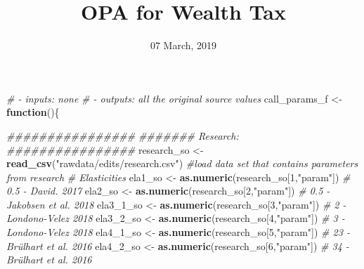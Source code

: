 \documentclass[]{article}
\title{OPA for Wealth Tax}
\author{}
\date{07 March, 2019}
\newenvironment{Shaded}{\begin{snugshade}}{\end{snugshade}}
\newcommand{\CommentTok}[1]{\textcolor[rgb]{0.56,0.35,0.01}{\textit{#1}}}
\newcommand{\ControlFlowTok}[1]{\textcolor[rgb]{0.13,0.29,0.53}{\textbf{#1}}}
\newcommand{\DecValTok}[1]{\textcolor[rgb]{0.00,0.00,0.81}{#1}}
\newcommand{\KeywordTok}[1]{\textcolor[rgb]{0.13,0.29,0.53}{\textbf{#1}}}
\newcommand{\NormalTok}[1]{#1}
\newcommand{\StringTok}[1]{\textcolor[rgb]{0.31,0.60,0.02}{#1}}
\begin{document}
\maketitle

\begin{Shaded}
\begin{Highlighting}[]
\CommentTok{# - inputs: none}
\CommentTok{# - outputs: all the original source values}
\NormalTok{call_params_f <-}\StringTok{ }\ControlFlowTok{function}\NormalTok{()\{}
  
  
  
    \CommentTok{################  }
    \CommentTok{####### Research:}
    \CommentTok{################  }
\NormalTok{    research_so <-}\StringTok{ }\KeywordTok{read_csv}\NormalTok{(}\StringTok{"rawdata/edits/research.csv"}\NormalTok{)      }\CommentTok{#load data set that contains parameters from research}
    \CommentTok{# Elasticities}
\NormalTok{    ela1_so <-}\StringTok{ }\KeywordTok{as.numeric}\NormalTok{(research_so[}\DecValTok{1}\NormalTok{,}\StringTok{"param"}\NormalTok{])           }\CommentTok{# 0.5 - David. 2017}
\NormalTok{    ela2_so <-}\StringTok{ }\KeywordTok{as.numeric}\NormalTok{(research_so[}\DecValTok{2}\NormalTok{,}\StringTok{"param"}\NormalTok{])           }\CommentTok{# 0.5 - Jakobsen et al. 2018}
\NormalTok{    ela3_}\DecValTok{1}\NormalTok{_so <-}\StringTok{ }\KeywordTok{as.numeric}\NormalTok{(research_so[}\DecValTok{3}\NormalTok{,}\StringTok{"param"}\NormalTok{])         }\CommentTok{# 2   - Londono-Velez 2018}
\NormalTok{    ela3_}\DecValTok{2}\NormalTok{_so <-}\StringTok{   }\KeywordTok{as.numeric}\NormalTok{(research_so[}\DecValTok{4}\NormalTok{,}\StringTok{"param"}\NormalTok{])       }\CommentTok{# 3   - Londono-Velez 2018}
\NormalTok{    ela4_}\DecValTok{1}\NormalTok{_so <-}\StringTok{ }\KeywordTok{as.numeric}\NormalTok{(research_so[}\DecValTok{5}\NormalTok{,}\StringTok{"param"}\NormalTok{])         }\CommentTok{# 23  - Brülhart et al. 2016}
\NormalTok{    ela4_}\DecValTok{2}\NormalTok{_so <-}\StringTok{ }\KeywordTok{as.numeric}\NormalTok{(research_so[}\DecValTok{6}\NormalTok{,}\StringTok{"param"}\NormalTok{])         }\CommentTok{# 34  - Brülhart et al. 2016}
    

\end{Highlighting}
\end{Shaded}
\end{document}
